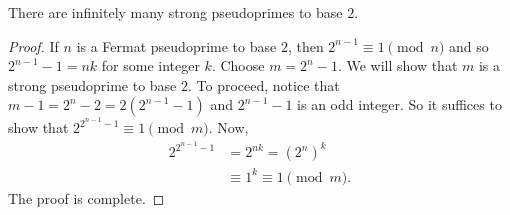 \documentclass{subfile}
\begin{document}
	\begin{proposition}
		There are infinitely many strong pseudoprimes to base $2$.
	\end{proposition}

	\begin{proof}
		If $n$ is a Fermat pseudoprime to base $2$, then $2^{n-1} \equiv 1 \pmod n$ and so $2^{n-1}-1=nk$ for some integer $k$. Choose $m=2^{n}-1$. We will show that $m$ is a strong pseudoprime to base $2$. To proceed, notice that $m-1=2^n-2=2\left(2^{n-1}-1\right)$ and $2^{n-1}-1$ is an odd integer. So it suffices to show that $2^{2^{n-1}-1} \equiv 1 \pmod m$. Now,
			\begin{align*}
				2^{2^{n-1}-1}
					& = 2^{nk}= \left(2^n\right)^k\\
					& \equiv 1^k \equiv 1 \pmod{m}.
			\end{align*}
		The proof is complete.
	\end{proof}
\end{document}
